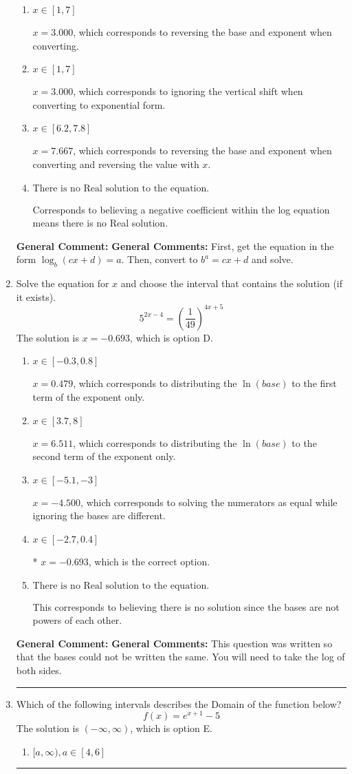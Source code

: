 \documentclass{extbook}[14pt]
\newcommand{\litem}[1]{\item #1

\rule{\textwidth}{0.4pt}}
\begin{document}
\begin{enumerate}
{\begin{enumerate}[label=\Alph*.]
* $x = -2.312$, which is the correct option.
\item \( x \in [1, 7] \)

$x = 3.000$, which corresponds to reversing the base and exponent when converting.
\item \( x \in [1, 7] \)

$x = 3.000$, which corresponds to ignoring the vertical shift when converting to exponential form.
\item \( x \in [6.2, 7.8] \)

$x = 7.667$, which corresponds to reversing the base and exponent when converting and reversing the value with $x$.
\item \( \text{There is no Real solution to the equation.} \)

Corresponds to believing a negative coefficient within the log equation means there is no Real solution.
\end{enumerate}

\textbf{General Comment:} \textbf{General Comments:} First, get the equation in the form $\log_b{(cx+d)} = a$. Then, convert to $b^a = cx+d$ and solve.
}
\litem{
Solve the equation for $x$ and choose the interval that contains the solution (if it exists).
\[ 5^{2x-4} = \left(\frac{1}{49}\right)^{4x+5} \]
The solution is \( x = -0.693 \), which is option D.\begin{enumerate}[label=\Alph*.]
\item \( x \in [-0.3, 0.8] \)

$x = 0.479$, which corresponds to distributing the $\ln(base)$ to the first term of the exponent only.
\item \( x \in [3.7, 8] \)

$x = 6.511$, which corresponds to distributing the $\ln(base)$ to the second term of the exponent only.
\item \( x \in [-5.1, -3] \)

$x = -4.500$, which corresponds to solving the numerators as equal while ignoring the bases are different.
\item \( x \in [-2.7, 0.4] \)

* $x = -0.693$, which is the correct option.
\item \( \text{There is no Real solution to the equation.} \)

This corresponds to believing there is no solution since the bases are not powers of each other.
\end{enumerate}

\textbf{General Comment:} \textbf{General Comments:} This question was written so that the bases could not be written the same. You will need to take the log of both sides.
}
\litem{
Which of the following intervals describes the Domain of the function below?
\[ f(x) = e^{x+1}-5 \]
The solution is \( (-\infty, \infty) \), which is option E.\begin{enumerate}[label=\Alph*.]
\item \( [a, \infty), a \in [4, 6] \)


\end{enumerate}}
\end{enumerate}
\end{document}
